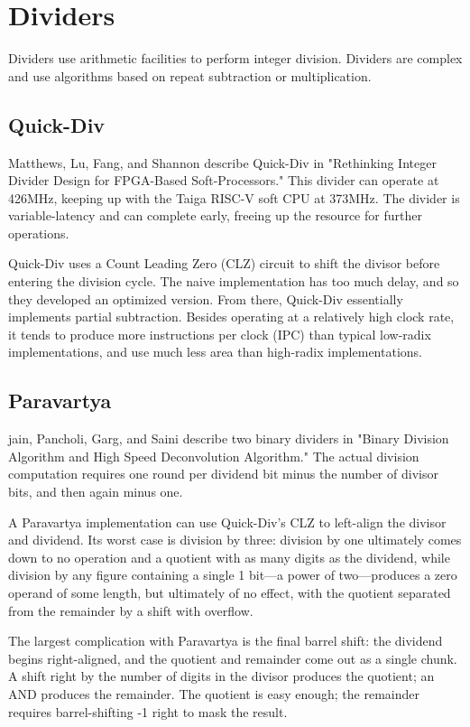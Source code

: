 \chapter{Dividers}
Dividers use arithmetic facilities to perform integer division.  Dividers are complex and use algorithms based on repeat subtraction or multiplication.

\section{Quick-Div}
Matthews, Lu, Fang, and Shannon describe Quick-Div in "Rethinking Integer Divider Design for FPGA-Based Soft-Processors."  This divider can operate at 426MHz, keeping up with the Taiga RISC-V soft CPU at 373MHz.  The divider is variable-latency and can complete early, freeing up the resource for further operations.

Quick-Div uses a Count Leading Zero (CLZ) circuit to shift the divisor before entering the division cycle.  The naive implementation has too much delay, and so they developed an optimized version.  From there, Quick-Div essentially implements partial subtraction.  Besides operating at a relatively high clock rate, it tends to produce more instructions per clock (IPC) than typical low-radix implementations, and use much less area than high-radix implementations.

\section{Paravartya}

jain, Pancholi, Garg, and Saini describe two binary dividers in "Binary Division Algorithm and High Speed Deconvolution Algorithm." The actual division computation requires one round per dividend bit minus the number of divisor bits, and then again minus one.

A Paravartya implementation can use Quick-Div's CLZ to left-align the divisor and dividend.  Its worst case is division by three:  division by one ultimately comes down to no operation and a quotient with as many digits as the dividend, while division by any figure containing a single 1 bit—a power of two—produces a zero operand of some length, but ultimately of no effect, with the quotient separated from the remainder by a shift with overflow.

The largest complication with Paravartya is the final barrel shift:  the dividend begins right-aligned, and the quotient and remainder come out as a single chunk.  A shift right by the number of digits in the divisor produces the quotient; an AND produces the remainder.  The quotient is easy enough; the remainder requires barrel-shifting -1 right to mask the result.